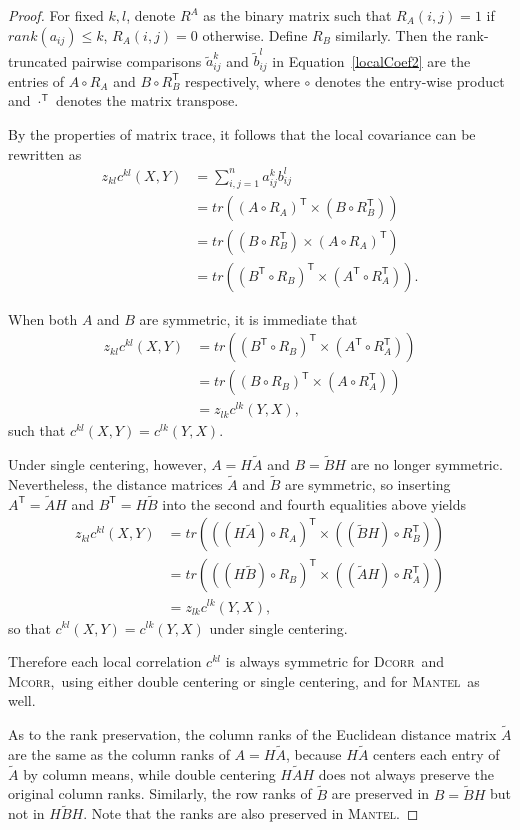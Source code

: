 \documentclass[11pt]{article}
\providecommand{\sct}[1]{{\normalfont\textsc{#1}}}
\providecommand{\mt}[1]{\widetilde{#1}}
\newcommand{\G}{c}
\newcommand{\T}{^{\ensuremath{\mathsf{T}}}}           %
\newcommand{\Dcorr}{\sct{Dcorr}}
\newcommand{\Mcorr}{\sct{Mcorr}}
\newcommand{\Mantel}{\sct{Mantel}}
\begin{document}
\begin{proof}
For fixed $k,l$, denote $R^{A}$ as the binary matrix such that $R_{A}(i,j)=1$ if $rank(a_{ij}) \leq k$, $R_{A}(i,j)=0$ otherwise. Define $R_{B}$ similarly. Then the rank-truncated pairwise comparisons $\mt{a}_{ij}^k$ and $\mt{b}_{ij}^l$ in Equation~\ref{localCoef2} are the entries of $A \circ R_{A}$ and $B \circ R_{B}\T$ respectively, where $\circ$ denotes the entry-wise product and $\cdot\T$ denotes the matrix transpose.

By the properties of matrix trace, it follows that the local covariance can be rewritten as
\begin{align*}
z_{kl} \G^{kl}(X,Y) &= \textstyle \sum_{i,j=1}^n a_{ij}^k b_{ij}^l \\
 &= tr((A \circ R_{A})\T \times (B \circ R_{B}\T)) \\
 &= tr((B \circ R_{B}\T) \times (A \circ R_{A})\T) \\
 &= tr((B\T \circ R_{B})\T \times (A\T \circ R_{A}\T)).
\end{align*}

When both $A$ and $B$ are symmetric, it is immediate that
\begin{align*}
z_{kl} \G^{kl}(X,Y) &= tr((B\T \circ R_{B})\T \times (A\T \circ R_{A}\T)) \\
 &= tr((B \circ R_{B})\T \times (A \circ R_{A}\T)) \\
 &= z_{lk} \G^{lk}(Y,X),
\end{align*}
such that $\G^{kl}(X,Y)=\G^{lk}(Y,X)$.

Under single centering, however, $A=H \tilde{A}$ and $B=\tilde{B}H$ are no longer symmetric. Nevertheless, the distance matrices $\tilde{A}$ and $\tilde{B}$ are symmetric, so inserting $A\T=\tilde{A}H$ and $B\T=H\tilde{B}$ into the second and fourth equalities above yields
\begin{align*}
z_{kl} \G^{kl}(X,Y) &= tr(((H \tilde{A}) \circ R_{A})\T \times ((\tilde{B}H) \circ R_{B}\T)) \\
 &= tr(((H \tilde{B}) \circ R_{B})\T \times ((\tilde{A}H) \circ R_{A}\T)) \\
 &= z_{lk} \G^{lk}(Y,X),
\end{align*}
so that $\G^{kl}(X,Y)=\G^{lk}(Y,X)$ under single centering.

Therefore each local correlation $\G^{kl}$ is always symmetric for \Dcorr~and \Mcorr,~using either double centering or single centering, and for \Mantel~as well.

As to the rank preservation, the column ranks of the Euclidean distance matrix $\tilde{A}$ are the same as the column ranks of $A=H \tilde{A}$, because $H \tilde{A}$ centers each entry of $\tilde{A}$ by column means, while double centering $H \tilde{A} H$ does not always preserve the original column ranks. Similarly, the row ranks of $\tilde{B}$ are preserved in $B=\tilde{B}H$ but not in $H \tilde{B} H$. Note that the ranks are also preserved in \Mantel.
\end{proof}
\end{document}
